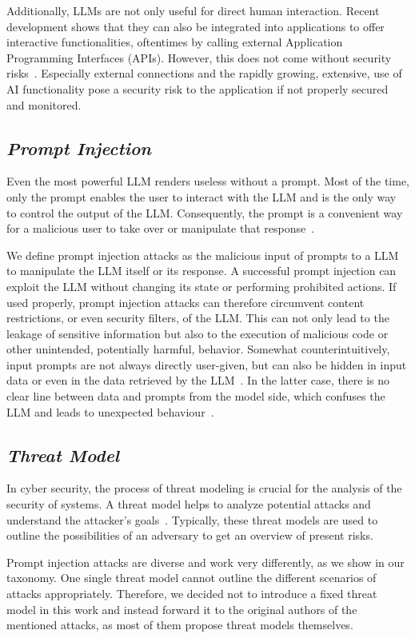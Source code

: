 Additionally, LLMs are not only useful for direct human interaction.
Recent development shows that they can also be integrated into applications to offer interactive functionalities, oftentimes by calling external Application Programming Interfaces (APIs).
However, this does not come without security risks~\cite{10.1145/3605764.3623985, liu2023demystifying, pedro2023prompt}. 
Especially external connections and the rapidly growing, extensive, use of AI functionality pose a security risk to the application if not properly secured and monitored.
\subsection{\textit{Prompt Injection}}
Even the most powerful LLM renders useless without a prompt.
Most of the time, only the prompt enables the user to interact with the LLM and is the only way to control the output of the LLM.
Consequently, the prompt is a convenient way for a malicious user to take over or manipulate that response~\cite{perez2022ignore}.

We define prompt injection attacks as the malicious input of prompts to a LLM to manipulate the LLM itself or its response. 
A successful prompt injection can exploit the LLM without changing its state or performing prohibited actions.
If used properly, prompt injection attacks can therefore circumvent content restrictions, or even security filters, of the LLM.
This can not only lead to the leakage of sensitive information but also to the execution of malicious code or other unintended, potentially harmful, behavior.
Somewhat counterintuitively, input prompts are not always directly user-given, but can also be hidden in input data or even in the data retrieved by the LLM~\cite{10.1145/3605764.3623985}.
In the latter case, there is no clear line between data and prompts from the model side, which confuses the LLM and leads to unexpected behaviour~\cite{10.1145/3605764.3623985}.
\subsection{\textit{Threat Model}}
In cyber security, the process of threat modeling is crucial for the analysis of the security of systems.
A threat model helps to analyze potential attacks and understand the attacker's goals~\cite{XIONG201953}.
Typically, these threat models are used to outline the possibilities of an adversary to get an overview of present risks.

Prompt injection attacks are diverse and work very differently, as we show in our taxonomy. 
One single threat model cannot outline the different scenarios of attacks appropriately.
Therefore, we decided not to introduce a fixed threat model in this work and instead forward it to the original authors of the mentioned attacks, as most of them propose threat models themselves.